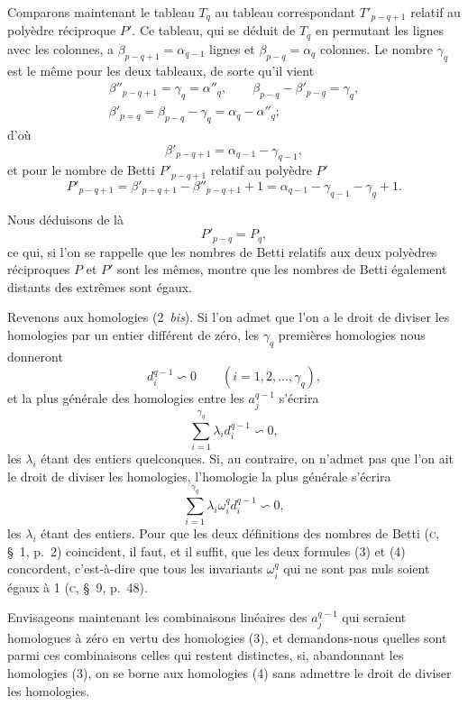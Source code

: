 \documentclass{article}
\begin{document}
Comparons maintenant le tableau $T_{q}$ au tableau correspondant $T'_{p-q+1}$ relatif au polyèdre réciproque $P'$. Ce tableau, qui se déduit de $T_{q}$ en permutant les lignes avec les colonnes, a $\beta_{p-q+1} = \alpha_{q-1}$ lignes et $\beta_{p-q} = \alpha_{q}$ colonnes. Le nombre $\gamma_{q}$ est le même pour les deux tableaux, de sorte qu'il vient
\[ \begin{gathered} \beta''_{p-q+1} = \gamma_{q} = \alpha''_{q}, \qquad \beta_{p-q} - \beta'_{p-q} = \gamma_{q}, \\ \beta'_{p=q} = \beta_{p-q} - \gamma_{q} = \alpha_{q} - \alpha''_{q}; \end{gathered} \]
d'où
\[ \beta'_{p-q+1} = \alpha_{q-1} - \gamma_{q-1}, \]
et pour le nombre de Betti $P'_{p-q+1}$ relatif au polyèdre $P'$
\[ P'_{p-q+1} = \beta'_{p-q+1} - \beta''_{p-q+1} + 1 = \alpha_{q-1} - \gamma_{q-1} - \gamma_{q} + 1. \]

Nous déduisons de là
\[ P'_{p-q} = P_{q}, \]
ce qui, si l'on se rappelle que les nombres de Betti relatifs aux deux polyèdres réciproques $P$ et $P'$ sont les mêmes, montre que les nombres de Betti également distants des extrêmes sont égaux.

Revenons aux homologies (2~\emph{bis}). Si l'on admet que l'on a le droit de diviser les homologies par un entier différent de zéro, les $\gamma_{q}$ premières homologies nous donneront
\[ d^{q-1}_{i} \backsim 0 \qquad (i = 1, 2, \ldots, \gamma_{q}), \]
et la plus générale des homologies entre les $a^{q-1}_{j}$ s'écrira
\[ \sum_{i=1}^{\gamma_{q}} \lambda_{i} d^{q-1}_{i} \backsim 0, \tag{3} \]
les $\lambda_{i}$ étant des entiers quelconques. Si, au contraire, on n'admet pas que l'on ait le droit de diviser les homologies, l'homologie la plus générale s'écrira
\[ \sum_{i=1}^{\gamma_{q}} \lambda_{i} \omega^{q}_{i} d^{q-1}_{i} \backsim 0, \tag{4} \]
les $\lambda_{i}$ étant des entiers. Pour que les deux définitions des nombres de Betti (\textsc{c}, \S~1, p.\ 2) coincident, il faut, et il suffit, que les deux formules (3) et (4) concordent, c'est-à-dire que tous les invariants $\omega^{q}_{i}$ qui ne sont pas nuls soient égaux à 1 (\textsc{c}, \S~9, p.\ 48).

Envisageons maintenant les combinaisons linéaires des $a^{q-1}_{j}$ qui seraient homologues à zéro en vertu des homologies (3), et demandons-nous quelles sont parmi ces combinaisons celles qui restent distinctes,
si, abandonnant les homologies (3), on se borne aux homologies (4) sans admettre le droit de diviser les homologies.
\end{document}
